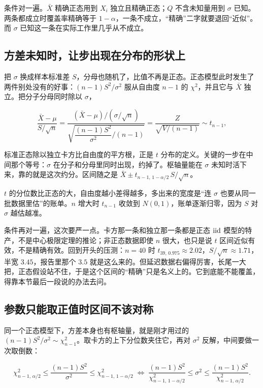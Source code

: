 条件对一遍。\(\bar X\) 精确正态用到 \(X_i\) 独立且精确正态；\(Q\) 不含未知量用到 \(\sigma\) 已知。两条都成立时覆盖率精确等于 \(1-\alpha\)，一条不成立，``精确''二字就要退回``近似''。而 \(\sigma\) 已知这一条在实际工作里几乎从不成立。

\subsection{方差未知时，让步出现在分布的形状上}

把 \(\sigma\) 换成样本标准差 \(S\)，分母也随机了，比值不再是正态。正态模型此时发生了两件别处没有的好事：\((n-1)S^2/\sigma^2\) 服从自由度 \(n-1\) 的 \(\chi^2\)，并且它与 \(\bar X\) 独立。把分子分母同时除以 \(\sigma\)，

\[
\frac{\bar X-\mu}{S/\sqrt n}
=\frac{(\bar X-\mu)\big/(\sigma/\sqrt n)}{\sqrt{\dfrac{(n-1)S^2}{\sigma^2}\Big/(n-1)}}
=\frac{Z}{\sqrt{V/(n-1)}}\sim t_{n-1},
\]

标准正态除以独立卡方比自由度的平方根，正是 \(t\) 分布的定义。关键的一步在中间那个等号：\(\sigma\) 在分子和分母里同时出现，约掉了。枢轴量能在 \(\sigma\) 未知时活下来，靠的就是这次约分。区间随之是 \(\bar X\pm t_{n-1,\,1-\alpha/2}\,S/\sqrt n\)。

\(t\) 的分位数比正态的大，自由度越小差得越多，多出来的宽度是``连 \(\sigma\) 也要从同一批数据里估''的账单。\(n\) 增大时 \(t_{n-1}\) 收敛到 \(N(0,1)\)，账单逐渐归零，因为 \(S\) 对 \(\sigma\) 越估越准。

条件再对一遍，这次要严一点。卡方那一条和独立那一条都是正态 \(\mathrm{iid}\) 模型的特产，不是中心极限定理的推论；非正态数据即使 \(n\) 很大，也只是说 \(t\) 区间近似有效，不是精确有效。回到开头的压测：\(n=40\) 时 \(t_{39,\,0.975}\approx2.02\)，\(S/\sqrt n\approx1.71\)，半宽 \(3.45\)，报告里那个 \(3.5\) 就是这么来的。但延迟数据右偏得厉害，长尾一大把，正态假设站不住，于是这个区间的``精确''只是名义上的。它到底能不能覆盖，得靠本节最后一段说的办法去问。

\subsection{参数只能取正值时区间不该对称}

同一个正态模型下，方差本身也有枢轴量，就是刚才用过的 \((n-1)S^2/\sigma^2\sim\chi^2_{n-1}\)。取卡方的上下分位数夹住它，再对 \(\sigma^2\) 反解，中间要做一次取倒数：

\[
\chi^2_{n-1,\,\alpha/2}\le\frac{(n-1)S^2}{\sigma^2}\le\chi^2_{n-1,\,1-\alpha/2}
\;\Longleftrightarrow\;
\frac{(n-1)S^2}{\chi^2_{n-1,\,1-\alpha/2}}\le\sigma^2\le\frac{(n-1)S^2}{\chi^2_{n-1,\,\alpha/2}} .
\]

